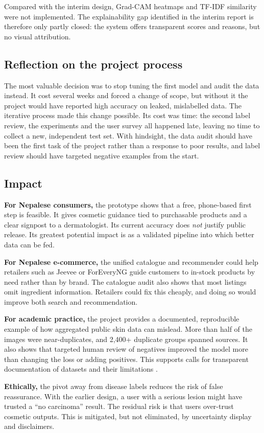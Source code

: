 Compared with the interim design, Grad-CAM heatmaps and TF-IDF similarity were not implemented. The explainability gap identified in the interim report is therefore only partly closed: the system offers transparent scores and reasons, but no visual attribution.

\subsection*{Reflection on the project process}

The most valuable decision was to stop tuning the first model and audit the data instead. It cost several weeks and forced a change of scope, but without it the project would have reported high accuracy on leaked, mislabelled data. The iterative process made this change possible. Its cost was time: the second label review, the experiments and the user survey all happened late, leaving no time to collect a new, independent test set. With hindsight, the data audit should have been the first task of the project rather than a response to poor results, and label review should have targeted negative examples from the start.

\subsection{Impact}

\textbf{For Nepalese consumers,} the prototype shows that a free, phone-based first step is feasible. It gives cosmetic guidance tied to purchasable products and a clear signpost to a dermatologist. Its current accuracy does \emph{not} justify public release. Its greatest potential impact is as a validated pipeline into which better data can be fed.

\textbf{For Nepalese e-commerce,} the unified catalogue and recommender could help retailers such as Jeevee or ForEveryNG guide customers to in-stock products by need rather than by brand. The catalogue audit also shows that most listings omit ingredient information. Retailers could fix this cheaply, and doing so would improve both search and recommendation.

\textbf{For academic practice,} the project provides a documented, reproducible example of how aggregated public skin data can mislead. More than half of the images were near-duplicates, and 2,400+ duplicate groups spanned sources. It also shows that targeted human review of negatives improved the model more than changing the loss or adding positives. This supports calls for transparent documentation of datasets and their limitations \citep{gebru2021}.

\textbf{Ethically,} the pivot away from disease labels reduces the risk of false reassurance. With the earlier design, a user with a serious lesion might have trusted a ``no carcinoma'' result. The residual risk is that users over-trust cosmetic outputs. This is mitigated, but not eliminated, by uncertainty display and disclaimers.
